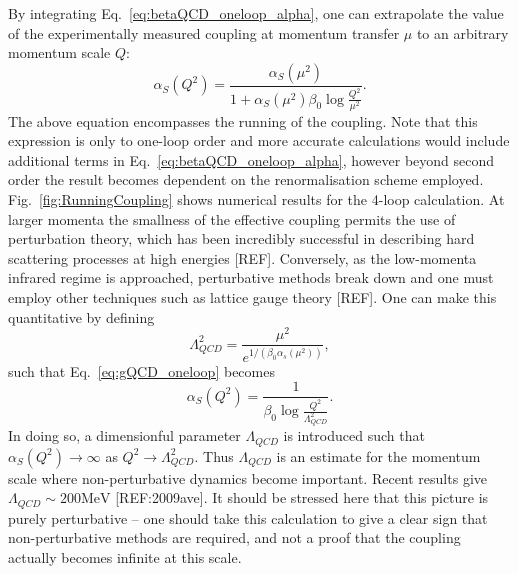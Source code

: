 \documentclass[12pt, a4paper, twoside]{book}
\newcommand{\brac}[1] {\!\left(#1\right)}
\begin{document}
By integrating Eq.~\eqref{eq:betaQCD_oneloop_alpha}, one can extrapolate the value of the experimentally measured coupling at momentum transfer \(\mu\) to an arbitrary momentum scale \(Q\):
\begin{equation}
\label{eq:gQCD_oneloop}
\alpha_S\brac{Q^2}=\frac{\alpha_S\brac{\mu^2}}{1+\alpha_S\brac{\mu^2}\beta_0\log\frac{Q^2}{\mu^2}}.
\end{equation}
The above equation encompasses the running of the coupling. Note that this expression is only to one-loop order and more accurate calculations would include additional terms in Eq.~\eqref{eq:betaQCD_oneloop_alpha}, however beyond second order the result becomes dependent on the renormalisation scheme employed. Fig.~\ref{fig:RunningCoupling} shows numerical results for the 4-loop calculation. At larger momenta the smallness of the effective coupling permits the use of perturbation theory, which has been incredibly successful in describing hard scattering processes at high energies [REF]. Conversely, as the low-momenta infrared regime is approached, perturbative methods break down and one must employ other techniques such as lattice gauge theory [REF]. One can make this quantitative by defining 
\begin{equation}
\label{eq:|ambdaQCD}
\Lambda_{QCD}^2=\frac{\mu^2}{e^{1/\brac{\beta_0\alpha_s\brac{\mu^2}}}},
\end{equation}
such that Eq.~\ref{eq:gQCD_oneloop} becomes
\begin{equation}
\label{eq:gQCD_oneloop_new}
\alpha_S\brac{Q^2}=\frac{1}{\beta_0\log\frac{Q^2}{\Lambda_{QCD}^2}}.
\end{equation}
In doing so, a dimensionful parameter \(\Lambda_{QCD}\) is introduced such that \(\alpha_S\brac{Q^2}\to\infty\) as \(Q^2\to\Lambda_{QCD}^2\). Thus \(\Lambda_{QCD}\) is an estimate for the momentum scale where non-perturbative dynamics become important. Recent results give \(\Lambda_{QCD}\sim 200\mathrm{MeV}\) [REF:2009ave]. It should be stressed here that this picture is purely perturbative -- one should take this calculation to give a clear sign that non-perturbative methods are required, and not a proof that the coupling actually becomes infinite at this scale.
\end{document}
